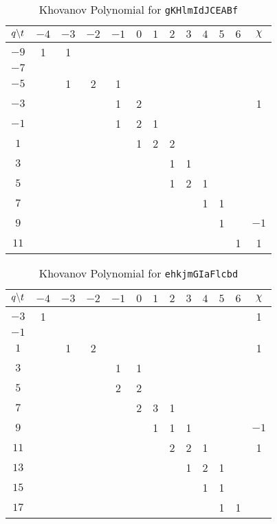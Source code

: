 \documentclass{article}
\theoremstyle{plain}
\begin{document}
        \begin{table}
            \centering
            \begin{tabular}{| c | c | c | c | c | c | c | c | c | c | c | c | c |}
                \hline
                $q\symbol{92}t$&$-4$&$-3$&$-2$&$-1$&$0$&$1$&$2$&$3$&$4$&$5$&$6$&$\chi$\\
                \hline
                $-9$&1&1&&&&&&&&&&\\
                \hline
                $-7$&&&&&&&&&&&&\\
                \hline
                $-5$&&1&2&1&&&&&&&&\\
                \hline
                $-3$&&&&1&2&&&&&&&1\\
                \hline
                $-1$&&&&1&2&1&&&&&&\\
                \hline
                $1$&&&&&1&2&2&&&&&\\
                \hline
                $3$&&&&&&&1&1&&&&\\
                \hline
                $5$&&&&&&&1&2&1&&&\\
                \hline
                $7$&&&&&&&&&1&1&&\\
                \hline
                $9$&&&&&&&&&&1&&$-1$\\
                \hline
                $11$&&&&&&&&&&&1&1\\
                \hline
            \end{tabular}
            \caption{Khovanov Polynomial for \texttt{gKHlmIdJCEABf}}
        \end{table}
        \begin{table}
            \centering
            \begin{tabular}{| c | c | c | c | c | c | c | c | c | c | c | c | c |}
                \hline
                $q\symbol{92}t$&$-4$&$-3$&$-2$&$-1$&$0$&$1$&$2$&$3$&$4$&$5$&$6$&$\chi$\\
                \hline
                $-3$&1&&&&&&&&&&&1\\
                \hline
                $-1$&&&&&&&&&&&&\\
                \hline
                $1$&&1&2&&&&&&&&&1\\
                \hline
                $3$&&&&1&1&&&&&&&\\
                \hline
                $5$&&&&2&2&&&&&&&\\
                \hline
                $7$&&&&&2&3&1&&&&&\\
                \hline
                $9$&&&&&&1&1&1&&&&$-1$\\
                \hline
                $11$&&&&&&&2&2&1&&&1\\
                \hline
                $13$&&&&&&&&1&2&1&&\\
                \hline
                $15$&&&&&&&&&1&1&&\\
                \hline
                $17$&&&&&&&&&&1&1&\\
                \hline
            \end{tabular}
            \caption{Khovanov Polynomial for \texttt{ehkjmGIaFlcbd}}
        \end{table}
\end{document}
